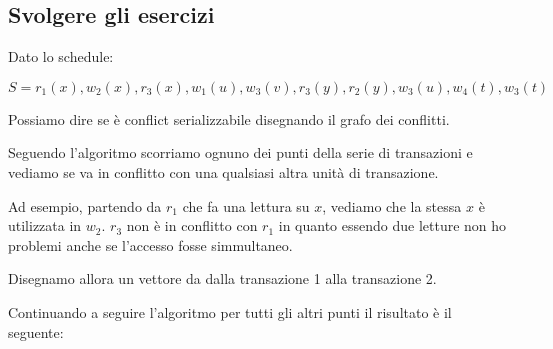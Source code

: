 \subsection{Svolgere gli esercizi}

\begin{exmp}
    Dato lo schedule:

    \[S = r_1(x), w_2(x), r_3(x), w_1(u), w_3(v), r_3(y), r_2(y), w_3(u), w_4(t), w_3(t)\]

    Possiamo dire se è conflict serializzabile disegnando il grafo dei conflitti.

    Seguendo l'algoritmo scorriamo ognuno dei punti della serie di transazioni e vediamo se va in conflitto con una qualsiasi altra unità di transazione.

    Ad esempio, partendo da \textbf{$r_1$} che fa una lettura su \textbf{$x$}, vediamo che la stessa \textbf{$x$} è utilizzata in \textbf{$w_2$}. \textbf{$r_3$} non è in conflitto con \textbf{$r_1$} in quanto essendo due letture non ho problemi anche se l'accesso fosse simmultaneo.

    Disegnamo allora un vettore da dalla transazione 1 alla transazione 2.
    \begin{center}
    \end{center}

    Continuando a seguire l'algoritmo per tutti gli altri punti il risultato è il seguente:
    \begin{center}
    \end{center}


\end{exmp}
